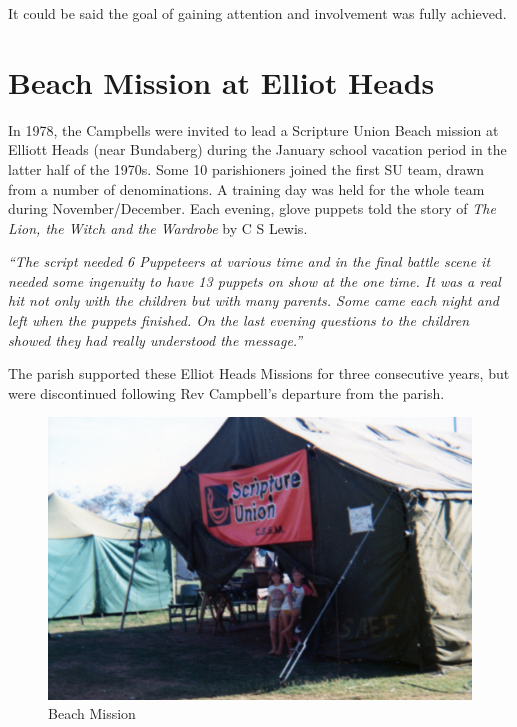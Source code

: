 \smallskip


It could be said the goal of gaining attention and involvement was fully achieved.



\section{Beach Mission at Elliot Heads}



In 1978, the Campbells were invited to lead a Scripture Union Beach mission at Elliott Heads (near Bundaberg) during the January school vacation period in the latter half of the 1970s. Some 10 parishioners joined the first SU team, drawn from a number of denominations. A training day was held for the whole team during November/December. Each evening, glove puppets told the story of \emph{The Lion, the Witch and the Wardrobe} by C S Lewis.



\emph{``The script needed 6 Puppeteers at various time and in the final battle scene it needed some ingenuity to have 13 puppets on show at the one time. It was a real hit not only with the children but with many parents. Some came each night and left when the puppets finished. On the last evening questions to the children showed they had really understood the message.''}



The parish supported these Elliot Heads Missions for three consecutive years, but were discontinued following Rev Campbell's departure from the parish.









\begin{figure}[!htb]
\begin{center}
\includegraphics[width=1.\textwidth,center]{../images/beachMission1980.jpg}
\caption{Beach Mission}
\end{center}
\end{figure}




